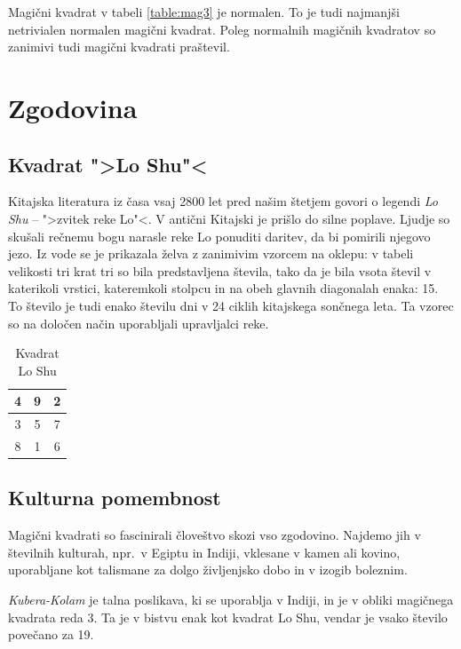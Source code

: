 \documentclass[a4paper,12pt]{article}
\theoremstyle{definition}
\theoremstyle{plain}
\newenvironment{magic}[3]
{
    \begin{table}[!ht]
    \centering
    \caption{#2}
    \label{#3}
    \large
    \begin{tabular}{|*{#1}{c|}}
    \hline
}
{
    \end{tabular}
    \normalsize
    \end{table}
}
\begin{document}
Magični kvadrat v tabeli \ref{table:mag3} je normalen.
To je tudi najmanjši netrivialen normalen magični kvadrat.
Poleg normalnih magičnih kvadratov so zanimivi tudi magični kvadrati praštevil.


\section{Zgodovina}

\subsection{Kvadrat ">Lo Shu"<}

Kitajska literatura iz časa vsaj 2800 let pred našim štetjem govori o legendi
\emph{Lo Shu} -- ">zvitek reke Lo"<. V antični Kitajski je prišlo do
silne poplave. Ljudje so skušali rečnemu bogu narasle reke Lo ponuditi daritev,
da bi pomirili njegovo jezo. Iz vode se je prikazala želva z zanimivim vzorcem
na oklepu: v tabeli velikosti tri krat tri so bila predstavljena števila, tako
da je bila vsota števil v katerikoli vrstici, kateremkoli stolpcu in na obeh
glavnih diagonalah enaka: 15. To število je tudi enako številu dni v 24 ciklih
kitajskega sončnega leta. Ta vzorec so na določen način uporabljali upravljalci
reke.


\begin{magic}{3}{Kvadrat Lo Shu}{table:loshu}
    4 & 9 & 2 \\ \hline
    3 & 5 & 7 \\ \hline
    8 & 1 & 6 \\ \hline
\end{magic}



\subsection{Kulturna pomembnost}

Magični kvadrati so fascinirali človeštvo skozi vso zgodovino. Najdemo jih
v številnih kulturah, npr.\ v Egiptu in Indiji, vklesane v kamen ali
kovino, uporabljane kot talismane za dolgo življenjsko dobo in v
izogib boleznim.

\emph{Kubera-Kolam} je talna poslikava, ki se uporablja v Indiji, in je v
obliki magičnega kvadrata reda 3. Ta je v bistvu enak kot kvadrat
Lo Shu, vendar je vsako število povečano za 19.
\end{document}
